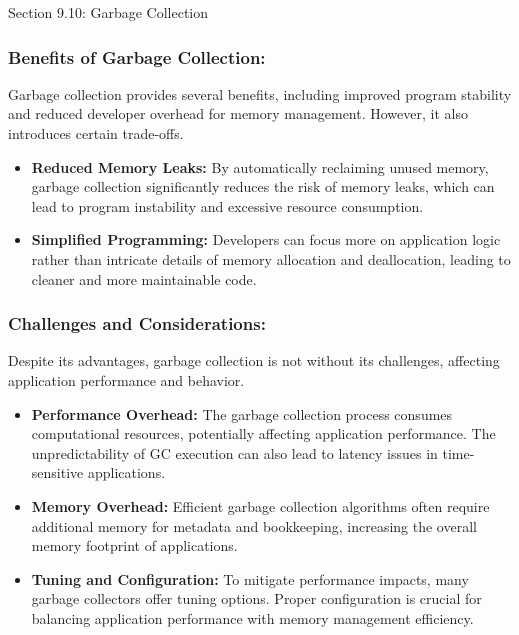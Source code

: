 \begin{notes}{Section 9.10: Garbage Collection}
    \subsubsection*{Benefits of Garbage Collection:}
    
    Garbage collection provides several benefits, including improved program stability and reduced developer overhead for memory management. However, it also introduces certain trade-offs.
    
    \begin{itemize}
        \item \textbf{Reduced Memory Leaks:} By automatically reclaiming unused memory, garbage collection significantly reduces the risk of memory leaks, which can lead to program instability and 
        excessive resource consumption.
        \item \textbf{Simplified Programming:} Developers can focus more on application logic rather than intricate details of memory allocation and deallocation, leading to cleaner and more maintainable code.
    \end{itemize}
    
    \subsubsection*{Challenges and Considerations:}
    
    Despite its advantages, garbage collection is not without its challenges, affecting application performance and behavior.
    
    \begin{itemize}
        \item \textbf{Performance Overhead:} The garbage collection process consumes computational resources, potentially affecting application performance. The unpredictability of GC execution can 
        also lead to latency issues in time-sensitive applications.
        \item \textbf{Memory Overhead:} Efficient garbage collection algorithms often require additional memory for metadata and bookkeeping, increasing the overall memory footprint of applications.
        \item \textbf{Tuning and Configuration:} To mitigate performance impacts, many garbage collectors offer tuning options. Proper configuration is crucial for balancing application performance 
        with memory management efficiency.
    \end{itemize}
    

\end{notes}
